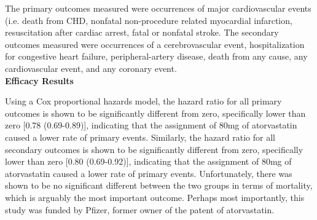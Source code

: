 \documentclass[11pt,a4paper]{article}
\begin{document}
The primary outcomes measured were occurrences of  major cardiovascular events (i.e. death from CHD, nonfatal non-procedure related myocardial infarction,  resuscitation after cardiac arrest, fatal or nonfatal stroke. The secondary outcomes measured were occurrences of a cerebrovascular event, hospitalization for congestive heart failure, peripheral-artery disease, death from any cause, any cardiovascular event, and any coronary event.\\

\noindent
\textbf{Efficacy Results}

Using a Cox proportional hazards model, the hazard ratio for all primary outcomes is shown to be significantly different from zero, specifically lower than zero [0.78 (0.69-0.89)], indicating that the assignment of 80mg of atorvastatin caused a lower rate of primary events. Similarly, the hazard ratio for all secondary outcomes is shown to be significantly different from zero, specifically lower than zero [0.80 (0.69-0.92)], indicating that the assignment of 80mg of atorvastatin caused a lower rate of primary events. Unfortunately, there was shown to be no significant different between the two groups in terms of mortality, which is arguably the most important outcome. Perhaps most importantly, this study was funded by Pfizer, former owner of the patent of atorvastatin.
 
\end{document}
